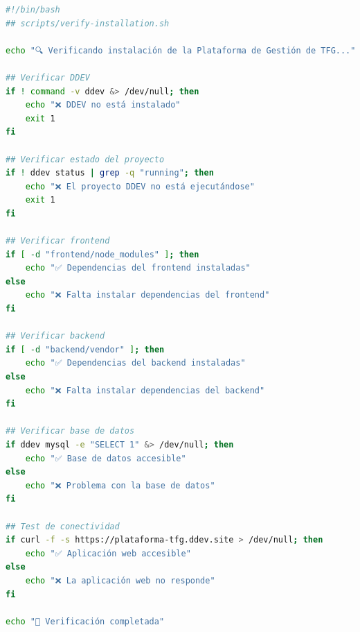 \documentclass[12pt,a4paper,oneside]{report}
\begin{document}
\begin{lstlisting}[language=bash]
#!/bin/bash
## scripts/verify-installation.sh

echo "🔍 Verificando instalación de la Plataforma de Gestión de TFG..."

## Verificar DDEV
if ! command -v ddev &> /dev/null; then
    echo "❌ DDEV no está instalado"
    exit 1
fi

## Verificar estado del proyecto
if ! ddev status | grep -q "running"; then
    echo "❌ El proyecto DDEV no está ejecutándose"
    exit 1
fi

## Verificar frontend
if [ -d "frontend/node_modules" ]; then
    echo "✅ Dependencias del frontend instaladas"
else
    echo "❌ Falta instalar dependencias del frontend"
fi

## Verificar backend
if [ -d "backend/vendor" ]; then
    echo "✅ Dependencias del backend instaladas"
else
    echo "❌ Falta instalar dependencias del backend"
fi

## Verificar base de datos
if ddev mysql -e "SELECT 1" &> /dev/null; then
    echo "✅ Base de datos accesible"
else
    echo "❌ Problema con la base de datos"
fi

## Test de conectividad
if curl -f -s https://plataforma-tfg.ddev.site > /dev/null; then
    echo "✅ Aplicación web accesible"
else
    echo "❌ La aplicación web no responde"
fi

echo "🎉 Verificación completada"
\end{lstlisting}




\end{document}
